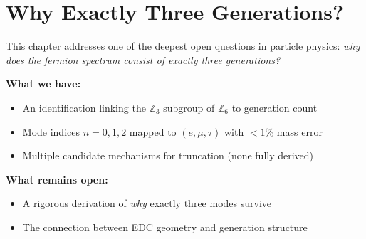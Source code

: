 
\section{Why Exactly Three Generations?}
\label{sec:ch5_three_generations}

\begin{tcolorbox}[edcGuardrail, title=\textbf{Epistemic Status: HIGH RISK}]
This chapter addresses one of the deepest open questions in particle physics:
\emph{why does the fermion spectrum consist of exactly three generations?}

\textbf{What we have:}
\begin{itemize}[nosep]
    \item An identification linking the $\mathbb{Z}_3$ subgroup of $\mathbb{Z}_6$ to
          generation count \tagI{}
    \item Mode indices $n = 0, 1, 2$ mapped to $(e, \mu, \tau)$ with $<1\%$ mass
          error \tagI{}
    \item Multiple candidate mechanisms for truncation (none fully derived)
\end{itemize}

\textbf{What remains open:}
\begin{itemize}[nosep]
    \item A rigorous derivation of \emph{why} exactly three modes survive
    \item The connection between EDC geometry and generation structure
\end{itemize}
\end{tcolorbox}


